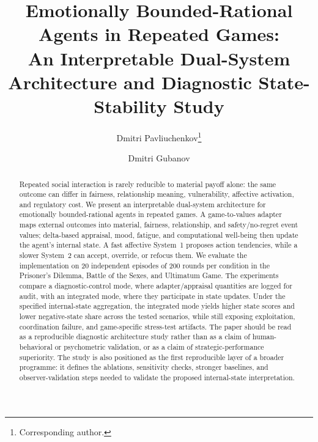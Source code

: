 \documentclass[runningheads]{llncs}
\begin{document}
\title{Emotionally Bounded-Rational Agents in Repeated Games:\\
An Interpretable Dual-System Architecture and Diagnostic State-Stability Study}

\author{Dmitri Pavliuchenkov\thanks{Corresponding author.} \and Dmitri Gubanov}

\maketitle

\begin{abstract}
Repeated social interaction is rarely reducible to material payoff alone: the same outcome can differ in fairness, relationship meaning, vulnerability, affective activation, and regulatory cost. We present an interpretable dual-system architecture for emotionally bounded-rational agents in repeated games. A game-to-values adapter maps external outcomes into material, fairness, relationship, and safety/no-regret event values; delta-based appraisal, mood, fatigue, and computational well-being then update the agent's internal state. A fast affective System~1 proposes action tendencies, while a slower System~2 can accept, override, or refocus them. We evaluate the implementation on 20 independent episodes of 200 rounds per condition in the Prisoner's Dilemma, Battle of the Sexes, and Ultimatum Game. The experiments compare a diagnostic-control mode, where adapter/appraisal quantities are logged for audit, with an integrated mode, where they participate in state updates. Under the specified internal-state aggregation, the integrated mode yields higher state scores and lower negative-state share across the tested scenarios, while still exposing exploitation, coordination failure, and game-specific stress-test artifacts. The paper should be read as a reproducible diagnostic architecture study rather than as a claim of human-behavioral or psychometric validation, or as a claim of strategic-performance superiority. The study is also positioned as the first reproducible layer of a broader programme: it defines the ablations, sensitivity checks, stronger baselines, and observer-validation steps needed to validate the proposed internal-state interpretation.
\end{abstract}
\end{document}

